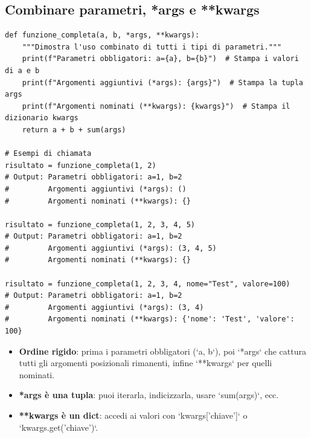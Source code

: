 \subsection{Combinare parametri, *args e **kwargs}
\label{subsec:fun-combinazione}
\begin{lstlisting}
def funzione_completa(a, b, *args, **kwargs):
    """Dimostra l'uso combinato di tutti i tipi di parametri."""
    print(f"Parametri obbligatori: a={a}, b={b}")  # Stampa i valori di a e b
    print(f"Argomenti aggiuntivi (*args): {args}")  # Stampa la tupla args
    print(f"Argomenti nominati (**kwargs): {kwargs}")  # Stampa il dizionario kwargs
    return a + b + sum(args)

# Esempi di chiamata
risultato = funzione_completa(1, 2)
# Output: Parametri obbligatori: a=1, b=2
#         Argomenti aggiuntivi (*args): ()
#         Argomenti nominati (**kwargs): {}

risultato = funzione_completa(1, 2, 3, 4, 5)
# Output: Parametri obbligatori: a=1, b=2
#         Argomenti aggiuntivi (*args): (3, 4, 5)
#         Argomenti nominati (**kwargs): {}

risultato = funzione_completa(1, 2, 3, 4, nome="Test", valore=100)
# Output: Parametri obbligatori: a=1, b=2
#         Argomenti aggiuntivi (*args): (3, 4)
#         Argomenti nominati (**kwargs): {'nome': 'Test', 'valore': 100}
\end{lstlisting}
\begin{tcolorbox}[title=Spiegazione del codice]
\begin{itemize}
  \item \textbf{Ordine rigido}: prima i parametri obbligatori (`a, b`), poi `*args` che cattura tutti gli argomenti posizionali rimanenti, infine `**kwargs` per quelli nominati.
  \item \textbf{*args è una tupla}: puoi iterarla, indicizzarla, usare `sum(args)`, ecc.
  \item \textbf{**kwargs è un dict}: accedi ai valori con `kwargs['chiave']` o `kwargs.get('chiave')`.
\end{itemize}
\end{tcolorbox}

